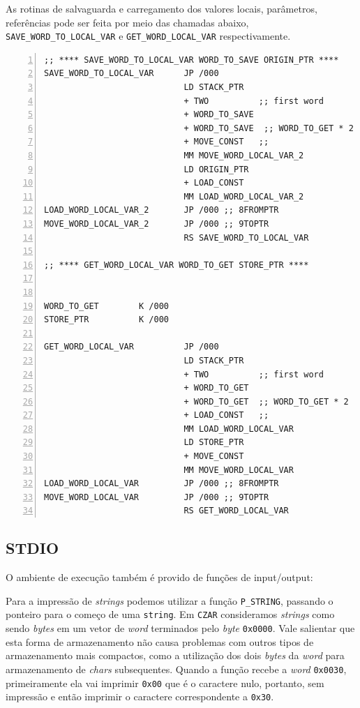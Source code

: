 As rotinas de salvaguarda e carregamento dos valores locais, parâmetros,
   referências pode ser feita por meio das chamadas abaixo, 
   \verb!SAVE_WORD_TO_LOCAL_VAR! e \verb!GET_WORD_LOCAL_VAR! respectivamente.

\begin{lstlisting}[basicstyle=\footnotesize,numbers=left,breaklines=true,morekeywords={}]
;; **** SAVE_WORD_TO_LOCAL_VAR WORD_TO_SAVE ORIGIN_PTR ****
SAVE_WORD_TO_LOCAL_VAR      JP /000 
                            LD STACK_PTR
                            + TWO          ;; first word 
                            + WORD_TO_SAVE 
                            + WORD_TO_SAVE  ;; WORD_TO_GET * 2
                            + MOVE_CONST   ;; 
                            MM MOVE_WORD_LOCAL_VAR_2
                            LD ORIGIN_PTR
                            + LOAD_CONST 
                            MM LOAD_WORD_LOCAL_VAR_2
LOAD_WORD_LOCAL_VAR_2       JP /000 ;; 8FROMPTR
MOVE_WORD_LOCAL_VAR_2       JP /000 ;; 9TOPTR
                            RS SAVE_WORD_TO_LOCAL_VAR

;; **** GET_WORD_LOCAL_VAR WORD_TO_GET STORE_PTR ****


WORD_TO_GET        K /000 
STORE_PTR          K /000

GET_WORD_LOCAL_VAR          JP /000 
                            LD STACK_PTR
                            + TWO          ;; first word 
                            + WORD_TO_GET  
                            + WORD_TO_GET  ;; WORD_TO_GET * 2
                            + LOAD_CONST   ;; 
                            MM LOAD_WORD_LOCAL_VAR  
                            LD STORE_PTR
                            + MOVE_CONST 
                            MM MOVE_WORD_LOCAL_VAR
LOAD_WORD_LOCAL_VAR         JP /000 ;; 8FROMPTR
MOVE_WORD_LOCAL_VAR         JP /000 ;; 9TOPTR
                            RS GET_WORD_LOCAL_VAR
 \end{lstlisting}


\subsection{STDIO}


O ambiente de execução também é provido de funções de input/output:

Para a impressão de \emph{strings} podemos utilizar a função \verb!P_STRING!, 
     passando o ponteiro para o começo de uma \verb!string!. Em \verb!CZAR!
     consideramos \emph{strings} como sendo \emph{bytes} em um vetor de
     \emph{word} terminados pelo \emph{byte} \verb!0x0000!. Vale salientar que
     esta forma de armazenamento não causa problemas com outros tipos de
     armazenamento mais compactos, como a utilização dos dois \emph{bytes}
     da \emph{word} para armazenamento de \emph{chars} subsequentes. Quando a
     função recebe a \emph{word} \verb!0x0030!, primeiramente ela vai imprimir
     \verb!0x00! que é o caractere nulo, portanto, sem impressão e então
     imprimir o caractere correspondente a \verb!0x30!. 

